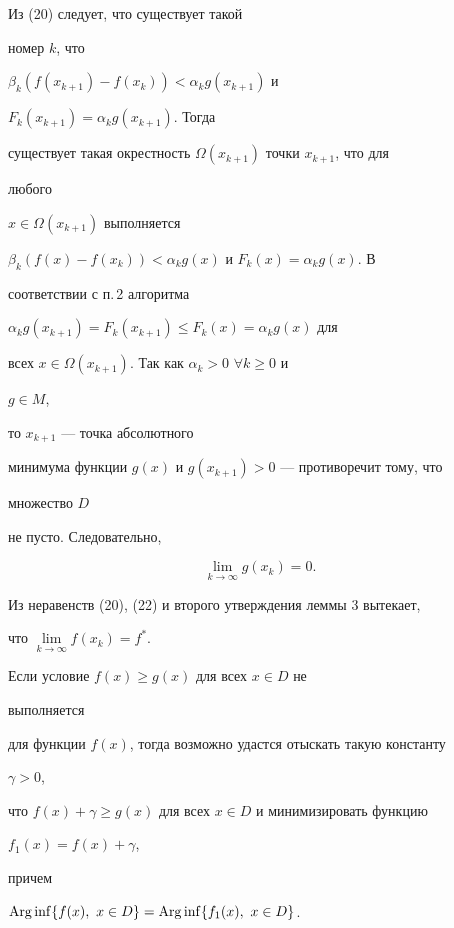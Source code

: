 \begin{pf}
Из (20) следует, что существует такой 


номер $k$, что 


$\beta_k(f(x_{k+1})-f(x_k))<\alpha_k g(x_{k+1})$ и 


$F_k(x_{k+1})=\alpha_k g(x_{k+1})$. Тогда 


существует такая окрестность $\Omega(x_{k+1})$ точки $x_{k+1}$, что для 


любого 


$x\in\Omega(x_{k+1})$ выполняется 


$\beta_k(f(x)-f(x_k))<\alpha_k g(x)$ и $F_k(x)=\alpha_k g(x)$. В 


соответствии с п.\,2 алгоритма 


$\alpha_k g(x_{k+1})=F_k(x_{k+1})\le F_k(x)=\alpha_k g(x)$ для 


всех $x\in\Omega(x_{k+1})$. Так как $\alpha_k>0$ $\forall k\ge 0$ и 


$g\in M$, 


то $x_{k+1}$ --- точка абсолютного 


минимума функции $g(x)$ и $g(x_{k+1})>0$ --- противоречит тому, что 


множество $D$ 


не пусто. Следовательно, 


\begin{equation} 


\lim_{k\to\infty}g(x_k)=0. 


\end{equation} 


 


Из неравенств (20), (22) и второго утверждения леммы 3 вытекает, 


что $\lim\limits_{k\to\infty}f(x_k)=f^*$. 


\end{pf} 


 


\begin{notenonum} Если условие $f(x)\ge g(x)$ для всех $x\in D$ не 


выполняется 


для функции $f(x)$, тогда возможно удастся отыскать такую константу 


$\gamma>0$, 


что $f(x)+\gamma\ge g(x)$ для всех $x\in D$ и минимизировать функцию 


$f_1(x)=f(x)+\gamma$, 


причем 


$\operatorname{Arg}\inf\{f(x),\ x\in D\}=\operatorname{Arg}\inf\{f_1(x),\ x\in D\}$. 


\end{notenonum} 


